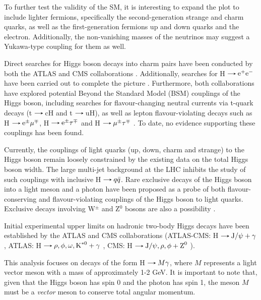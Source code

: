 To further test the validity of the SM, it is interesting to expand the plot to include lighter fermions, specifically the second-generation strange and charm quarks, as well as the first-generation fermions up and down quarks and the electron. Additionally, the non-vanishing masses of the neutrinos may suggest a Yukawa-type coupling for them as well.

Direct searches for Higgs boson decays into charm pairs have been conducted by both the ATLAS and CMS collaborations \cite{ATLAS:2018mgv, CMS:2019hve, ATLAS:2022ers, CMS:2022psv}. Additionally, searches for H$\decaysto \text{e}^+\text{e}^-$ have been carried out to complete the picture \cite{ATLAS:2019old, CMS:2022urr}. Furthermore, both collaborations have explored potential Beyond the Standard Model (BSM) couplings of the Higgs boson, including searches for flavour-changing neutral currents via t-quark decays (t$\decaysto$cH and t$\decaysto$uH), as well as lepton flavour-violating decays such as H$\decaysto \text{e}^\pm\mu^\mp$, H$\decaysto \text{e}^\pm\tau^\mp$ and H$\decaysto \mu^\pm\tau^\mp$ \cite{ATLAS:2019old, CMS:2021rsq, CMS:2021gfa}. To date, no evidence supporting these couplings has been found.

Currently, the couplings of light quarks (up, down, charm and strange) to the Higgs boson remain loosely constrained by the existing data on the total Higgs boson width. The large multi-jet background at the LHC inhibits the study of such couplings with inclusive H$\decaysto q\bar{q}$. Rare exclusive decays of the Higgs boson into a light meson and a photon have been proposed as a probe of both flavour-conserving and flavour-violating couplings of the Higgs boson to light quarks. Exclusive decays involving W$^\pm$ and Z$^0$ bosons are also a possibility \cite{Kagan:2014ila}.

Initial experimental upper limits on hadronic two-body Higgs decays have been established by the ATLAS and CMS collaborations (ATLAS-CMS: H$\decaysto \text{J}/\psi + \gamma$ \cite{ATLAS:2022rej, CMS:2018gcm}, ATLAS: H$\decaysto \rho,\phi,\omega,\text{K}^{*0} + \gamma$ \cite{ATLAS:2017gko, ATLAS:2023alf}, CMS: H$\decaysto \text{J}/\psi,\rho,\phi + \text{Z}^0$ \cite{CMS:2022fsq, CMS:2020ggo}).

This analysis focuses on decays of the form H$\decaysto M\gamma$, where $M$ represents a light vector meson with a mass of approximately 1-2 GeV. It is important to note that, given that the Higgs boson has spin 0 and the photon has spin 1, the meson $M$ must be a \textit{vector} meson to conserve total angular momentum.


